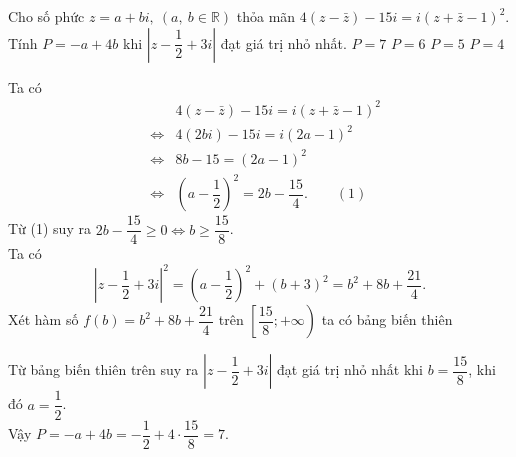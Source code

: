\begin{ex}%
	Cho số phức $z=a+bi,~(a,~b\in\mathbb{R})$ thỏa mãn $4\left(z-\bar{z}\right)-15i=i\left(z+\bar{z}-1\right)^2$. Tính $P=-a+4b$ khi $\left|z-\dfrac{1}{2}+3i\right|$ đạt giá trị nhỏ nhất.
	\choice
	{\True $P=7$}
	{$P=6$}
	{$P=5$}
	{$P=4$}
	\loigiai
	{
		Ta có 
		\begin{eqnarray*}
			& & 4\left(z-\bar{z}\right)-15i=i\left(z+\bar{z}-1\right)^2\\
			& \Leftrightarrow & 4(2bi)-15i=i(2a-1)^2\\
			& \Leftrightarrow &8b-15=(2a-1)^2\\
			& \Leftrightarrow & \left(a-\dfrac{1}{2}\right)^2=2b-\dfrac{15}{4}.\qquad(1)
		\end{eqnarray*}
		Từ (1) suy ra $2b-\dfrac{15}{4}\ge0\Leftrightarrow b\ge\dfrac{15}{8}$.\\
		Ta có \[\left|z-\dfrac{1}{2}+3i\right|^2=\left(a-\dfrac{1}{2}\right)^2+(b+3)^2=b^2+8b+\dfrac{21}{4}.\]
		Xét hàm số $f(b)=b^2+8b+\dfrac{21}{4}$ trên $\left[\dfrac{15}{8};+\infty\right)$ ta có bảng biến thiên
		\begin{center}
		\end{center}
	Từ bảng biến thiên trên suy ra $\left|z-\dfrac{1}{2}+3i\right|$ đạt giá trị nhỏ nhất khi $b=\dfrac{15}{8}$, khi đó $a=\dfrac{1}{2}$.\\
	Vậy $P=-a+4b=-\dfrac{1}{2}+4\cdot\dfrac{15}{8}=7$.
	}
\end{ex}


